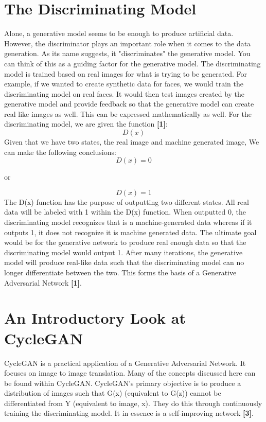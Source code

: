 \documentclass{cup-pan}
\begin{document}
\section{The Discriminating Model}

Alone, a generative model seems to be enough to produce artificial data. However, the discriminator plays an important role when it comes to the data generation. As its name suggests, it "discriminates" the generative model. You can think of this as a guiding factor for the generative model. The discriminating model is trained based on real images for what is trying to be generated. For example, if we wanted to create synthetic data for faces, we would train the discriminating model on real faces. It would then test images created by the generative model and provide feedback so that the generative model can create real like images as well. This can be expressed mathematically as well. For the discriminating model, we are given the function \textbf{[1]}:
\begin{equation}
D(x)
\end{equation}
Given that we have two states, the real image and machine generated image, We can make the following conclusions:
\begin{equation}
D(x) = 0
\end{equation}
\centerline{or}
\begin{equation}
D(x) = 1
\end{equation}
The D(x) function has the purpose of outputting two different states. All real data will be labeled with 1 within the D(x) function. When outputted 0, the discriminating model recognizes that is a machine-generated data whereas if it outputs 1, it does not recognize it is machine generated data. The ultimate goal would be for the generative network to produce real enough data so that the discriminating model would output 1. After many iterations, the generative model will produce real-like data such that the discriminating model can no longer differentiate between the two. This forms the basis of a Generative Adversarial Network \textbf{[1]}. 

\section{An Introductory Look at CycleGAN}

CycleGAN is a practical application of a Generative Adversarial Network. It focuses on image to image translation. Many of the concepts discussed here can be found within CycleGAN. CycleGAN's primary objective is to produce a distribution of images such that G(x) (equivalent to G(z)) cannot be differentiated from Y (equivalent to image, x). They do this through continuously training the discriminating model. It in essence is a self-improving network \textbf{[3]}.
\end{document}
